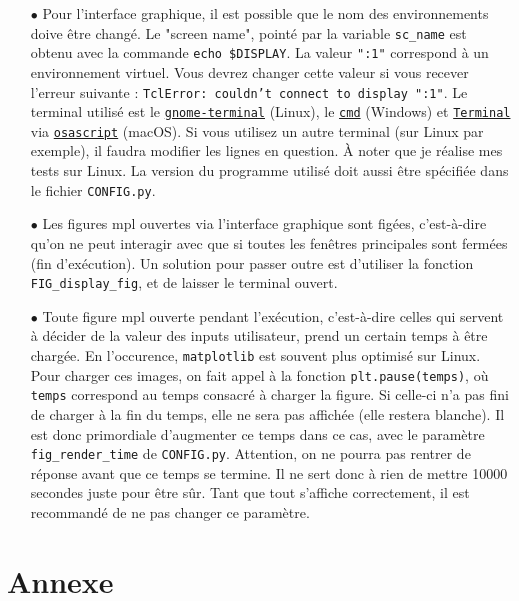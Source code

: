 \documentclass[12pt]{article}
\begin{document}
\begin{enumerate}
        \item[$\bullet$] Pour l'interface graphique, il est possible que le nom des environnements doive être changé. Le "screen name", pointé par la variable \texttt{sc\_name} est obtenu avec la commande \texttt{echo \$DISPLAY}. La valeur \texttt{":1"} correspond à un environnement virtuel. Vous devrez changer cette valeur si vous recever l'erreur suivante : \texttt{TclError: couldn't connect to display ":1"}. Le terminal utilisé est le \texttt{\href{https://help.gnome.org/users/gnome-terminal/stable/}{gnome-terminal}} (Linux), le \texttt{\href{https://learn.microsoft.com/fr-fr/windows-server/administration/windows-commands/cmd}{cmd}} (Windows) et \texttt{\href{https://learn.microsoft.com/fr-fr/windows-server/administration/windows-commands/cmd}{Terminal}} via \texttt{\href{https://ss64.com/mac/osascript.html}{osascript}} (macOS). Si vous utilisez un autre terminal (sur Linux par exemple), il faudra modifier les lignes en question. À noter que je réalise mes tests sur Linux. La version du programme utilisé doit aussi être spécifiée dans le fichier \texttt{CONFIG.py}.

        \item[$\bullet$] Les figures mpl ouvertes via l'interface graphique sont figées, c'est-à-dire qu'on ne peut interagir avec que si toutes les fenêtres principales sont fermées (fin d'exécution). Un solution pour passer outre est d'utiliser la fonction \texttt{FIG\_display\_fig}, et de laisser le terminal ouvert.

        \item[$\bullet$] Toute figure mpl ouverte pendant l'exécution, c'est-à-dire celles qui servent à décider de la valeur des inputs utilisateur, prend un certain temps à être chargée. En l'occurence, \texttt{matplotlib} est souvent plus optimisé sur Linux. Pour charger ces images, on fait appel à la fonction \texttt{plt.pause(temps)}, où \texttt{temps} correspond au temps consacré à charger la figure. Si celle-ci n'a pas fini de charger à la fin du temps, elle ne sera pas affichée (elle restera blanche). Il est donc primordiale d'augmenter ce temps dans ce cas, avec le paramètre \texttt{fig\_render\_time} de \texttt{CONFIG.py}. Attention, on ne pourra pas rentrer de réponse avant que ce temps se termine. Il ne sert donc à rien de mettre 10000 secondes juste pour être sûr. Tant que tout s'affiche correctement, il est recommandé de ne pas changer ce paramètre.
    \end{enumerate}

\newpage
\section{Annexe}
\end{document}
